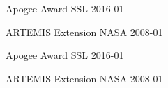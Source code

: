




\begin{cvhonors}

  \cvhonor
    {Apogee Award} %
    {SSL} %
    {} %
    {2016-01} %


  \cvhonor
    {ARTEMIS Extension} %
    {NASA} %
    {} %
    {2008-01} %


\end{cvhonors}




\begin{cvhonors}

  \cvhonor
  {Apogee Award} %
  {SSL} %
  {} %
  {2016-01} %


  \cvhonor
  {ARTEMIS Extension} %
  {NASA} %
  {} %
  {2008-01} %


\end{cvhonors}

